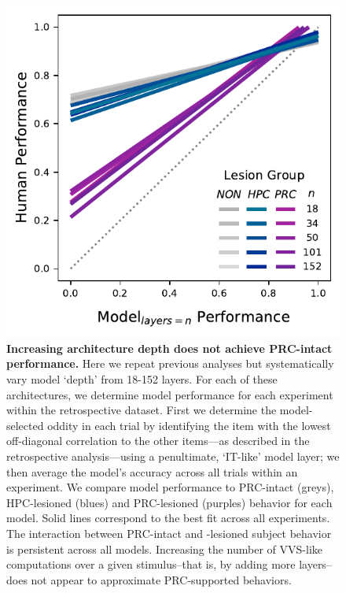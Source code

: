 \documentclass[11pt]{article}
\begin{document}
\begin{figure}[ht]
\centering
\includegraphics[width=.7\linewidth]{figures/F6}
\caption{\textbf{Increasing architecture depth does not achieve PRC-intact performance.} Here we repeat previous analyses but systematically vary model `depth' from 18-152 layers. For each of these architectures, we determine model performance for each experiment within the retrospective dataset. First we determine the model-selected oddity in each trial by identifying the item with the lowest off-diagonal correlation to the other items---as described in the retrospective analysis---using a penultimate, `IT-like' model layer; we then average the model's accuracy across all trials within an experiment. We compare model performance to PRC-intact (greys), HPC-lesioned (blues) and PRC-lesioned (purples) behavior for each model. Solid lines correspond to the best fit across all experiments. The interaction between PRC-intact and -lesioned subject behavior is persistent across all models. Increasing the number of VVS-like computations over a given stimulus–that is, by adding more layers–does not appear to approximate PRC-supported behaviors.}
\label{fig:layer_analysis}
\end{figure}


\end{document}
